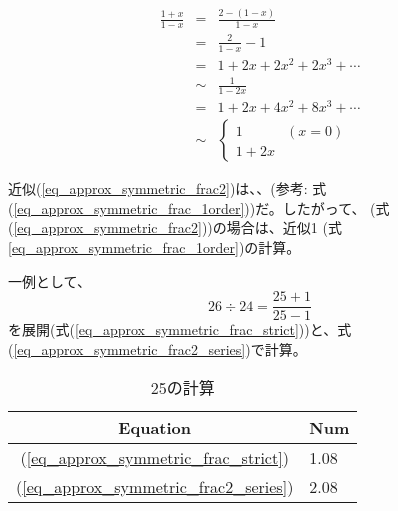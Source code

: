 \documentclass[a4paper, 12pt]{article}
\begin{document}
\begin{eqnarray}
  \frac{1+x}{1-x} & = & \frac{2-(1-x)}{1-x} \nonumber\\
                & = & \frac{2}{1-x} - 1\nonumber\\
                & = & 1 + 2x + 2x^2 + 2x^3 + \cdots \label{eq_approx_symmetric_frac_strict}\\
                & \sim & \frac{1}{1-2x} \label{eq_approx_symmetric_frac2}\\
                & = & 1 + 2x + 4x^2 + 8x^3 + \cdots  \label{eq_approx_symmetric_frac2_series}\\
                & \sim & %
  \left\{
  \begin{array}{ll}
    1 & (x=0)\\
    1 + 2x
  \end{array} \right. \label{eq_approx_symmetric_frac_1order}
\end{eqnarray}

近似(\ref{eq_approx_symmetric_frac2})は、、(参考: 式(\ref{eq_approx_symmetric_frac_1order}))だ。したがって、 (式(\ref{eq_approx_symmetric_frac2}))の場合は、近似1 (式\ref{eq_approx_symmetric_frac_1order})の計算。

一例として、
\begin{equation}
 26\div24 = \frac{25+1}{25-1}
\end{equation}
を展開(式(\ref{eq_approx_symmetric_frac_strict}))と、式(\ref{eq_approx_symmetric_frac2_series})で計算。

\begin{table}[htbp]
  \centering
  \caption{25の計算}
  \label{tbl_25pm1_taylor}
  \begin{tabular}{cl}
    \hline
    Equation & Num \\
    \hline
    (\ref{eq_approx_symmetric_frac_strict}) & 1.08 \\
    (\ref{eq_approx_symmetric_frac2_series}) & 2.08 \\
    \hline
  \end{tabular}
\end{table}
\end{document}

